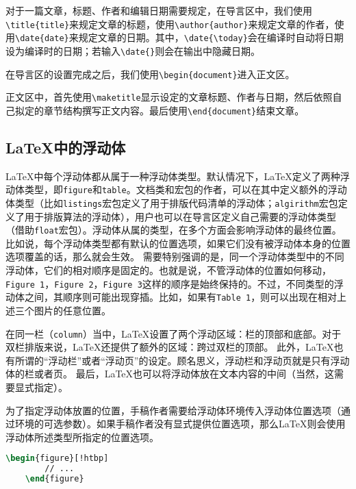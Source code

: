 对于一篇文章，标题、作者和编辑日期需要规定，在导言区中，我们使用\texttt{\textbackslash title\{title\}}来规定文章的标题，使用\texttt{\textbackslash author\{author\}}来规定文章的作者，使用\texttt{\textbackslash date\{date\}}来规定文章的日期。其中，\texttt{\textbackslash date\{\textbackslash today\}}会在编译时自动将日期设为编译时的日期；若输入\texttt{\textbackslash date\{\}}则会在输出中隐藏日期。

在导言区的设置完成之后，我们使用\texttt{\textbackslash begin\{document\}}进入正文区。

正文区中，首先使用\texttt{\textbackslash maketitle}显示设定的文章标题、作者与日期，然后依照自己拟定的章节结构撰写正文内容。最后使用\texttt{\textbackslash end\{document\}}结束文章。

\subsection{\LaTeX{}中的浮动体}

\LaTeX{}中每个浮动体都从属于一种浮动体类型。默认情况下，\LaTeX{}定义了两种浮动体类型，即\texttt{figure}和\texttt{table}。文档类和宏包的作者，可以在其中定义额外的浮动体类型（比如\texttt{listings}宏包定义了用于排版代码清单的浮动体；\texttt{algirithm}宏包定义了用于排版算法的浮动体），用户也可以在导言区定义自己需要的浮动体类型（借助\texttt{float}宏包）。浮动体从属的类型，在多个方面会影响浮动体的最终位置。比如说，每个浮动体类型都有默认的位置选项，如果它们没有被浮动体本身的位置选项覆盖的话，那么就会生效。 需要特别强调的是，同一个浮动体类型中的不同浮动体，它们的相对顺序是固定的。也就是说，不管浮动体的位置如何移动，\texttt{Figure 1}，\texttt{Figure 2}，\texttt{Figure 3}这样的顺序是始终保持的。不过，不同类型的浮动体之间，其顺序则可能出现穿插。比如，如果有\texttt{Table 1}，则可以出现在相对上述三个图片的任意位置。

在同一栏（\texttt{column}）当中，\LaTeX{}设置了两个浮动区域：栏的顶部和底部。对于双栏排版来说，\LaTeX{}还提供了额外的区域：跨过双栏的顶部。 此外，\LaTeX{}也有所谓的“浮动栏”或者“浮动页”的设定。顾名思义，浮动栏和浮动页就是只有浮动体的栏或者页。 最后，\LaTeX{}也可以将浮动体放在文本内容的中间（当然，这需要显式指定）。

为了指定浮动体放置的位置，手稿作者需要给浮动体环境传入浮动体位置选项（通过环境的可选参数）。如果手稿作者没有显式提供位置选项，那么\LaTeX{}则会使用浮动体所述类型所指定的位置选项。

\begin{lstlisting}[language=tex, breaklines=true, basicstyle=\ttfamily, frame=shadowbox]
    \begin{figure}[!htbp]
        // ...
    \end{figure}
\end{lstlisting}

